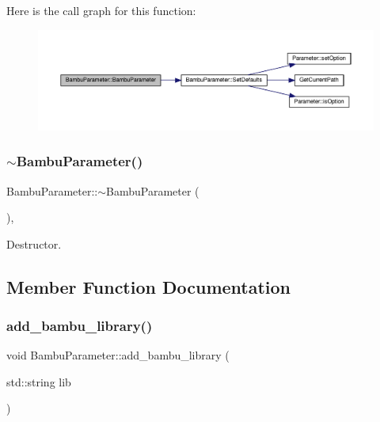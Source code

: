 Here is the call graph for this function\+:
\nopagebreak
\begin{figure}[H]
\begin{center}
\leavevmode
\includegraphics[width=350pt]{d4/d67/classBambuParameter_ac737f6a4cfdf92d143ad2c2b14b31ace_cgraph}
\end{center}
\end{figure}
\mbox{\label{classBambuParameter_affa28e0f3eec008d304dc1d96550b8ea}} 
\subsubsection{\texorpdfstring{$\sim$\+Bambu\+Parameter()}{~BambuParameter()}}
{\footnotesize\ttfamily Bambu\+Parameter\+::$\sim$\+Bambu\+Parameter (\begin{DoxyParamCaption}{ }\end{DoxyParamCaption})\hspace{0.3cm}{\ttfamily [override]}, {\ttfamily [default]}}



Destructor. 



\subsection{Member Function Documentation}
\mbox{\label{classBambuParameter_a82c89009ec3e4df0e56d530ea3caf470}} 
\subsubsection{\texorpdfstring{add\+\_\+bambu\+\_\+library()}{add\_bambu\_library()}}
{\footnotesize\ttfamily void Bambu\+Parameter\+::add\+\_\+bambu\+\_\+library (\begin{DoxyParamCaption}\item[{std\+::string}]{lib }\end{DoxyParamCaption})\hspace{0.3cm}{\ttfamily [private]}}




